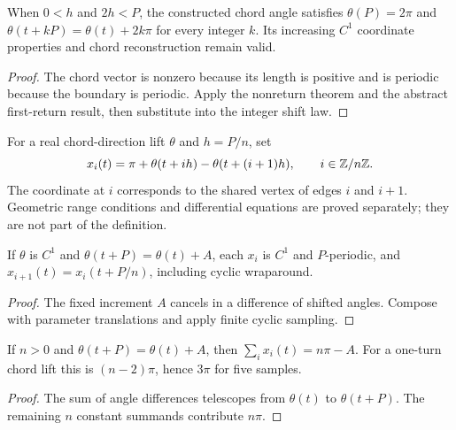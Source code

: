 \begin{proposition}
\label{prop:chord-one-turn}
\leanok
{}
When $0<h$ and $2h<P$, the constructed chord angle satisfies
$\theta(P)=2\pi$ and $\theta(t+kP)=\theta(t)+2k\pi$ for every integer $k$.
Its increasing $C^1$ coordinate properties and chord reconstruction remain valid.
\end{proposition}
\begin{proof}
\leanok
The chord vector is nonzero because its length is positive and is periodic
because the boundary is periodic. Apply the nonreturn theorem and the
abstract first-return result, then substitute into the integer shift law.
\end{proof}

\begin{definition}
\label{def:cyclic-angle-coordinates}
\leanok
{}
For a real chord-direction lift $\theta$ and $h=P/n$, set
\[
 x_i(t)=\pi+\theta(t+ih)-\theta(t+(i+1)h),\qquad i\in\mathbb{Z}/n\mathbb{Z}.
\]
The coordinate at $i$ corresponds to the shared vertex of edges $i$ and
$i+1$. Geometric range conditions and differential equations are proved
separately; they are not part of the definition.
\end{definition}

\begin{lemma}
\label{lem:cyclic-angle-api}
\leanok
{}
If $\theta$ is $C^1$ and $\theta(t+P)=\theta(t)+A$, each $x_i$ is $C^1$
and $P$-periodic, and $x_{i+1}(t)=x_i(t+P/n)$, including cyclic wraparound.
\end{lemma}
\begin{proof}
\leanok
The fixed increment $A$ cancels in a difference of shifted angles.
Compose with parameter translations and apply finite cyclic sampling.
\end{proof}

\begin{proposition}
\label{prop:cyclic-angle-sum}
\leanok
{}
If $n>0$ and $\theta(t+P)=\theta(t)+A$, then $\sum_i x_i(t)=n\pi-A$.
For a one-turn chord lift this is $(n-2)\pi$, hence $3\pi$ for five samples.
\end{proposition}
\begin{proof}
\leanok
The sum of angle differences telescopes from $\theta(t)$ to
$\theta(t+P)$. The remaining $n$ constant summands contribute $n\pi$.
\end{proof}

